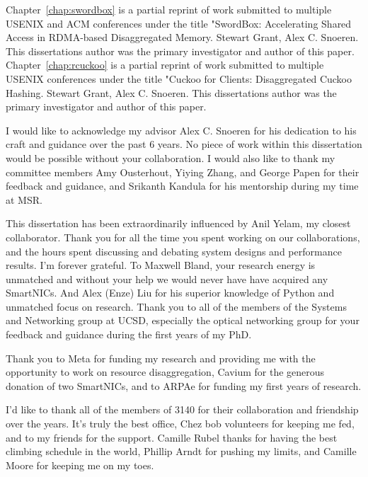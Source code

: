 \documentclass[12pt]{ucsddissertation}
\begin{document}
\begin{acknowledgements}

Chapter~\ref{chap:swordbox} is a partial reprint of work submitted to multiple USENIX and ACM
conferences under the title "SwordBox: Accelerating Shared Access in RDMA-based Disaggregated
Memory. Stewart Grant, Alex C. Snoeren. This dissertations author was the primary investigator and
author of this paper.
Chapter~\ref{chap:rcuckoo} is a partial reprint of work submitted to multiple USENIX conferences
under the title "Cuckoo for Clients: Disaggregated Cuckoo Hashing. Stewart Grant, Alex C. Snoeren.
This dissertations author was the primary investigator and author of this paper.

I would like to acknowledge my advisor Alex C. Snoeren for his dedication to his craft and guidance
over the past 6 years. No piece of work within this dissertation would be possible without your
collaboration. I would also like to thank my committee members Amy Ousterhout, Yiying Zhang, and
George Papen for their feedback and guidance, and Srikanth Kandula for his mentorship during my time
at MSR.

This dissertation has been extraordinarily influenced by Anil Yelam, my closest collaborator. Thank you
for all the time you spent working on our collaborations, and the hours spent discussing and
debating system designs and performance results. I'm forever grateful. To Maxwell Bland, your
research energy is unmatched and without your help we would never have have acquired any SmartNICs.
And Alex (Enze) Liu for his superior knowledge of Python and unmatched focus on research.  Thank you
to all of the members of the Systems and Networking group at UCSD, especially the optical networking
group for your feedback and guidance during the first years of my PhD.

Thank you to Meta for funding my research and providing me with the opportunity to work on resource
disaggregation, Cavium for the generous donation of two SmartNICs, and to ARPAe for funding my first
years of research.

I'd like to thank all of the members of 3140 for their collaboration and friendship over the years.
It's truly the best office, Chez bob volunteers for keeping me fed, and to my friends for the
support. Camille Rubel thanks for having the best climbing schedule in the world, Phillip Arndt for
pushing my limits, and Camille Moore for keeping me on my toes.


\end{acknowledgements}
\end{document}
